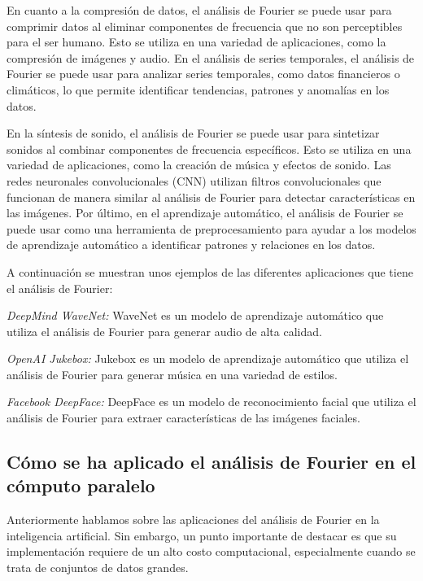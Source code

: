 En cuanto a la compresión de datos, el análisis de Fourier se puede usar para comprimir datos al eliminar componentes de frecuencia que no son perceptibles para el ser humano. Esto se utiliza en una variedad de aplicaciones, como la compresión de imágenes y audio. En el análisis de series temporales, el análisis de Fourier se puede usar para analizar series temporales, como datos financieros o climáticos, lo que permite identificar tendencias, patrones y anomalías en los datos.

En la síntesis de sonido, el análisis de Fourier se puede usar para sintetizar sonidos al combinar componentes de frecuencia específicos. Esto se utiliza en una variedad de aplicaciones, como la creación de música y efectos de sonido. Las redes neuronales convolucionales (CNN) utilizan filtros convolucionales que funcionan de manera similar al análisis de Fourier para detectar características en las imágenes. Por último, en el aprendizaje automático, el análisis de Fourier se puede usar como una herramienta de preprocesamiento para ayudar a los modelos de aprendizaje automático a identificar patrones y relaciones en los datos.

A continuación se muestran unos ejemplos de las diferentes aplicaciones que tiene el análisis de Fourier:

\begin{inparaenum}[1)]
	\item \emph{DeepMind WaveNet:} WaveNet es un modelo de aprendizaje automático que utiliza el análisis de Fourier para generar audio de alta calidad.
    \item \emph{OpenAI Jukebox:} Jukebox es un modelo de aprendizaje automático que utiliza el análisis de Fourier para generar música en una variedad de estilos.
    \item \emph{Facebook DeepFace:} DeepFace es un modelo de reconocimiento facial que utiliza el análisis de Fourier para extraer características de las imágenes faciales.
\end{inparaenum}

\subsection{Cómo se ha aplicado el análisis de Fourier en el cómputo paralelo}

Anteriormente hablamos sobre las aplicaciones del análisis de Fourier en la inteligencia artificial. Sin embargo, un punto importante de destacar es que su implementación requiere de un alto costo computacional, especialmente cuando se trata de conjuntos de datos grandes.

